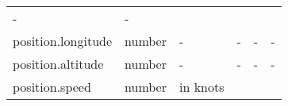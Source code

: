 \documentclass[
]{article}
\begin{document}
\begin{longtable}[]{@{}llllll@{}}
\begin{minipage}[t]{0.14\columnwidth}
-\strut
\end{minipage} & \begin{minipage}[t]{0.14\columnwidth}\raggedright
-\strut
\end{minipage}\tabularnewline
\begin{minipage}[t]{0.14\columnwidth}\raggedright
position.longitude\strut
\end{minipage} & \begin{minipage}[t]{0.14\columnwidth}\raggedright
number\strut
\end{minipage} & \begin{minipage}[t]{0.14\columnwidth}\raggedright
-\strut
\end{minipage} & \begin{minipage}[t]{0.14\columnwidth}\raggedright
-\strut
\end{minipage} & \begin{minipage}[t]{0.14\columnwidth}\raggedright
-\strut
\end{minipage} & \begin{minipage}[t]{0.14\columnwidth}\raggedright
-\strut
\end{minipage}\tabularnewline
\begin{minipage}[t]{0.14\columnwidth}\raggedright
position.altitude\strut
\end{minipage} & \begin{minipage}[t]{0.14\columnwidth}\raggedright
number\strut
\end{minipage} & \begin{minipage}[t]{0.14\columnwidth}\raggedright
-\strut
\end{minipage} & \begin{minipage}[t]{0.14\columnwidth}\raggedright
-\strut
\end{minipage} & \begin{minipage}[t]{0.14\columnwidth}\raggedright
-\strut
\end{minipage} & \begin{minipage}[t]{0.14\columnwidth}\raggedright
-\strut
\end{minipage}\tabularnewline
\begin{minipage}[t]{0.14\columnwidth}\raggedright
position.speed\strut
\end{minipage} & \begin{minipage}[t]{0.14\columnwidth}\raggedright
number\strut
\end{minipage} & \begin{minipage}[t]{0.14\columnwidth}\raggedright
in knots\strut
\end{minipage} & \begin{minipage}[t]{0.14\columnwidth}\raggedright

\end{minipage}
\end{longtable}
\end{document}
